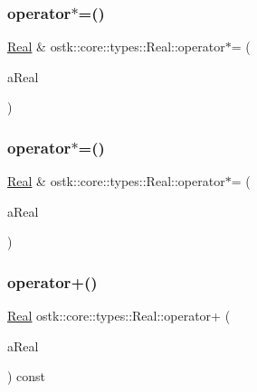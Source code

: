 \subsubsection{\texorpdfstring{operator$\ast$=()}{operator*=()}\hspace{0.1cm}{\footnotesize\ttfamily [1/2]}}
{\footnotesize\ttfamily \hyperlink{classostk_1_1core_1_1types_1_1_real}{Real} \& ostk\+::core\+::types\+::\+Real\+::operator$\ast$= (\begin{DoxyParamCaption}\item[{const \hyperlink{classostk_1_1core_1_1types_1_1_real}{Real} \&}]{a\+Real }\end{DoxyParamCaption})}

\mbox{\label{classostk_1_1core_1_1types_1_1_real_aca5f3766cb3c9d15874e7d742fb01286}} 
\subsubsection{\texorpdfstring{operator$\ast$=()}{operator*=()}\hspace{0.1cm}{\footnotesize\ttfamily [2/2]}}
{\footnotesize\ttfamily \hyperlink{classostk_1_1core_1_1types_1_1_real}{Real} \& ostk\+::core\+::types\+::\+Real\+::operator$\ast$= (\begin{DoxyParamCaption}\item[{const \hyperlink{classostk_1_1core_1_1types_1_1_real_aa26f796c30b514c98d573f82e3b02296}{Real\+::\+Value\+Type} \&}]{a\+Real }\end{DoxyParamCaption})}

\mbox{\label{classostk_1_1core_1_1types_1_1_real_af348138d5573a17ae926951dde891902}} 
\subsubsection{\texorpdfstring{operator+()}{operator+()}\hspace{0.1cm}{\footnotesize\ttfamily [1/4]}}
{\footnotesize\ttfamily \hyperlink{classostk_1_1core_1_1types_1_1_real}{Real} ostk\+::core\+::types\+::\+Real\+::operator+ (\begin{DoxyParamCaption}\item[{const \hyperlink{classostk_1_1core_1_1types_1_1_real}{Real} \&}]{a\+Real }\end{DoxyParamCaption}) const}


